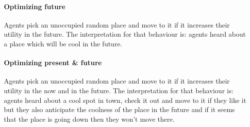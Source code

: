 \paragraph{Optimizing future} Agents pick an unoccupied random place and move to it if it increases their utility in the future. The interpretation for that behaviour is: agents heard about a place which will be cool in the future.

\paragraph{Optimizing present \& future} Agents pick an unoccupied random place and move to it if it increases their utility in the now and in the future. The interpretation for that behaviour is: agents heard about a cool spot in town, check it out and move to it if they like it but they also anticipate the coolness of the place in the future and if it seems that the place is going down then they won't move there.